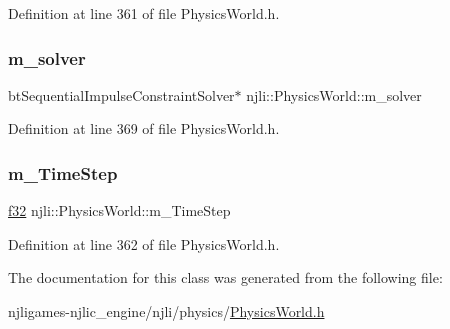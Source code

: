 Definition at line 361 of file Physics\+World.\+h.

\mbox{\label{classnjli_1_1_physics_world_a89f04597ef21e57dd83b634062343822}} 
\subsubsection{\texorpdfstring{m\+\_\+solver}{m\_solver}}
{\footnotesize\ttfamily bt\+Sequential\+Impulse\+Constraint\+Solver$\ast$ njli\+::\+Physics\+World\+::m\+\_\+solver\hspace{0.3cm}{\ttfamily [private]}}



Definition at line 369 of file Physics\+World.\+h.

\mbox{\label{classnjli_1_1_physics_world_a126ce6c1394f120b6b325a175ed1f21f}} 
\subsubsection{\texorpdfstring{m\+\_\+\+Time\+Step}{m\_TimeStep}}
{\footnotesize\ttfamily \mbox{\hyperlink{_util_8h_a5f6906312a689f27d70e9d086649d3fd}{f32}} njli\+::\+Physics\+World\+::m\+\_\+\+Time\+Step\hspace{0.3cm}{\ttfamily [private]}}



Definition at line 362 of file Physics\+World.\+h.



The documentation for this class was generated from the following file\+:\begin{DoxyCompactItemize}
\item 
njligames-\/njlic\+\_\+engine/njli/physics/\mbox{\hyperlink{_physics_world_8h}{Physics\+World.\+h}}\end{DoxyCompactItemize}
